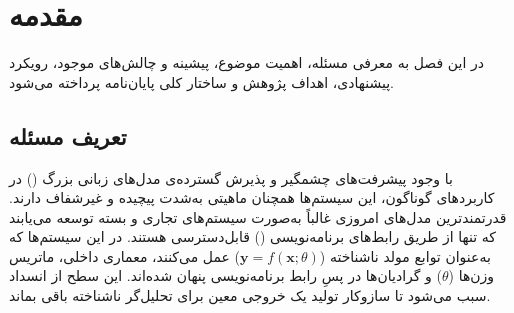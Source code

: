 %

\chapter{مقدمه}\label{chap:chapter1_introduction}

در این فصل به معرفی مسئله، اهمیت موضوع، پیشینه و چالش‌های موجود، رویکرد پیشنهادی، اهداف پژوهش و ساختار کلی پایان‌نامه پرداخته می‌شود.


\section{تعریف مسئله}\label{sec:1-1}

با وجود پیشرفت‌های چشمگیر و پذیرش گسترده‌ی مدل‌های زبانی بزرگ () در کاربردهای گوناگون، این سیستم‌ها همچنان ماهیتی به‌شدت پیچیده و غیرشفاف دارند. قدرتمندترین مدل‌های امروزی غالباً به‌صورت سیستم‌های تجاری و بسته توسعه می‌یابند که تنها از طریق رابط‌های برنامه‌نویسی () قابل‌دسترسی هستند. در این سیستم‌ها که به‌عنوان توابع مولد ناشناخته ($\mathbf{y} = f(\mathbf{x}; \theta)$) عمل می‌کنند، معماری داخلی، ماتریس وزن‌ها ($\theta$) و گرادیان‌ها در پسِ رابط برنامه‌نویسی پنهان شده‌اند. این سطح از انسداد سبب می‌شود تا سازوکار تولید یک خروجی معین برای تحلیل‌گر ناشناخته باقی بماند.

